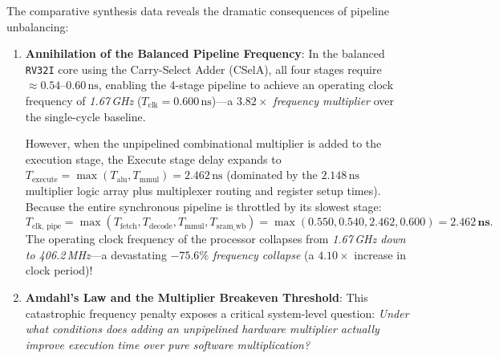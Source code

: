 The comparative synthesis data reveals the dramatic consequences of pipeline unbalancing:
\begin{enumerate}
    \item \textbf{Annihilation of the Balanced Pipeline Frequency}:
    In the balanced \texttt{RV32I} core using the Carry-Select Adder (CSelA), all four stages require $\approx 0.54\text{--}0.60\,\text{ns}$, enabling the 4-stage pipeline to achieve an operating clock frequency of \textit{1.67\,GHz} ($T_{\text{clk}} = 0.600\,\text{ns}$)---a \textit{$3.82\times$ frequency multiplier} over the single-cycle baseline.
    
    However, when the unpipelined combinational multiplier is added to the execution stage, the Execute stage delay expands to $T_{\text{execute}} = \max(T_{\text{alu}}, T_{\text{mmul}}) = 2.462\,\text{ns}$ (dominated by the $2.148\,\text{ns}$ multiplier logic array plus multiplexer routing and register setup times). Because the entire synchronous pipeline is throttled by its slowest stage:
    \begin{equation}
    T_{\text{clk, pipe}} = \max(T_{\text{fetch}}, T_{\text{decode}}, T_{\text{mmul}}, T_{\text{sram\_wb}}) = \max(0.550, 0.540, 2.462, 0.600) = \mathbf{2.462\,\text{ns}}.
    \end{equation}
    The operating clock frequency of the processor collapses from \textit{1.67\,GHz down to 406.2\,MHz}---a devastating \textit{$-75.6\%$ frequency collapse} (a $4.10\times$ increase in clock period)!
    
    \item \textbf{Amdahl's Law and the Multiplier Breakeven Threshold}:
    This catastrophic frequency penalty exposes a critical system-level question: \textit{Under what conditions does adding an unpipelined hardware multiplier actually improve execution time over pure software multiplication?}
    

\end{enumerate}
